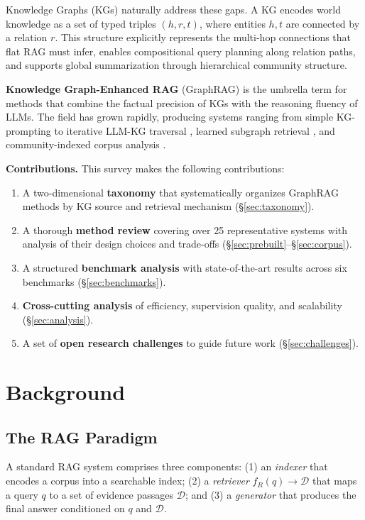 \documentclass[11pt]{article}
\begin{document}
Knowledge Graphs (KGs) naturally address these gaps. A KG encodes world knowledge as a set of typed triples $(h, r, t)$, where entities $h, t$ are connected by a relation $r$. This structure explicitly represents the multi-hop connections that flat RAG must infer, enables compositional query planning along relation paths, and supports global summarization through hierarchical community structure.

\textbf{Knowledge Graph-Enhanced RAG} (GraphRAG) is the umbrella term for methods that combine the factual precision of KGs with the reasoning fluency of LLMs. The field has grown rapidly, producing systems ranging from simple KG-prompting \cite{baek2023kaping} to iterative LLM-KG traversal \cite{sun2024tog}, learned subgraph retrieval \cite{wang2025subgraphrag}, and community-indexed corpus analysis \cite{edge2024graphrag}.

\textbf{Contributions.} This survey makes the following contributions:
\begin{enumerate}
\item A two-dimensional \textbf{taxonomy} that systematically organizes GraphRAG methods by KG source and retrieval mechanism (\S\ref{sec:taxonomy}).
\item A thorough \textbf{method review} covering over 25 representative systems with analysis of their design choices and trade-offs (\S\ref{sec:prebuilt}--\S\ref{sec:corpus}).
\item A structured \textbf{benchmark analysis} with state-of-the-art results across six benchmarks (\S\ref{sec:benchmarks}).
\item \textbf{Cross-cutting analysis} of efficiency, supervision quality, and scalability (\S\ref{sec:analysis}).
\item A set of \textbf{open research challenges} to guide future work (\S\ref{sec:challenges}).
\end{enumerate}

\section{Background}
\label{sec:background}

\subsection{The RAG Paradigm}

A standard RAG system comprises three components: (1) an \emph{indexer} that encodes a corpus into a searchable index; (2) a \emph{retriever} $f_R(q) \rightarrow \mathcal{D}$ that maps a query $q$ to a set of evidence passages $\mathcal{D}$; and (3) a \emph{generator} that produces the final answer conditioned on $q$ and $\mathcal{D}$.
\end{document}
